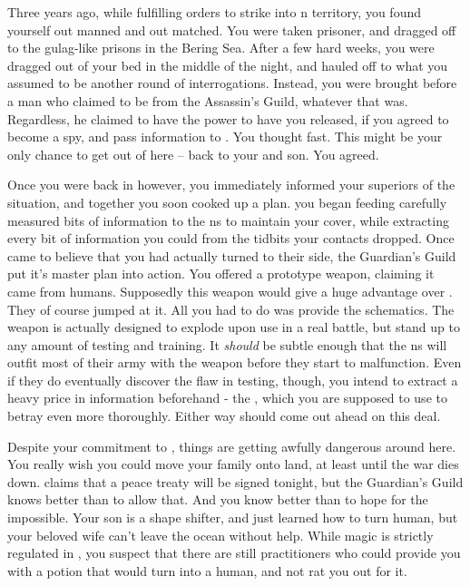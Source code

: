 \documentclass[char]{NeptuneBall}
\begin{document}
Three years ago, while fulfilling orders to strike into \pPacifica{}n territory, you found yourself out manned and out matched. You were taken prisoner, and dragged off to the gulag-like prisons in the Bering Sea. After a few hard weeks, you were dragged out of your bed in the middle of the night, and hauled off to what you assumed to be another round of interrogations. Instead, you were brought before a man who claimed to be from the Assassin's Guild, whatever that was. Regardless, he claimed to have the power to have you released, if you agreed to become a spy, and pass information to \pPacifica{}. You thought fast. This might be your only chance to get out of here -- back to your \cQueen{\spouse} and son. You agreed.

Once you were back in \pAtlantis{} however, you immediately informed your superiors of the situation, and together you soon cooked up a plan. you began feeding carefully measured bits of information to the \pPacifica{}ns to maintain your cover, while extracting every bit of information you could from the tidbits your contacts dropped. Once \pPacifica{} came to believe that you had actually turned to their side, the Guardian's Guild put it's master plan into action. You offered \pPacifica{} a prototype weapon, claiming it came from humans. Supposedly this weapon would give \pPacifica{} a huge advantage over \pAtlantis{}. They of course jumped at it.  All you had to do was provide the schematics. The weapon is actually designed to explode upon use in a real battle, but stand up to any amount of testing and training. It \emph{should} be subtle enough that the \pPacifica{}ns will outfit most of their army with the weapon before they start to malfunction. Even if they do eventually discover the flaw in testing, though, you intend to extract a heavy price in information beforehand - the \iBattlePlan{}, which you are supposed to use to betray \pAtlantis{} even more thoroughly. Either way \pAtlantis{} should come out ahead on this deal.

Despite your commitment to \pAtlantis{}, things are getting awfully dangerous around here. You really wish you could move your family onto land, at least until the war dies down. \cKing{\King} \cKing{} claims that a peace treaty will be signed tonight, but the Guardian's Guild knows better than to allow that. And you know better than to hope for the impossible. Your son is a shape shifter, and just learned how to turn human, but your beloved wife \cQueen{} can't leave the ocean without help. While magic is strictly regulated in \pAtlantis{}, you suspect that there are still practitioners who could provide you with a potion that would turn \cQueen{} into a human, and not rat you out for it.
\end{document}
